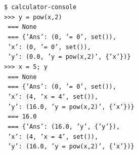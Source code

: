 \documentclass[a4paper, 11pt]{article}
\begin{document}
\noindent\texttt{\$ calculator-console} \\
\texttt{>>> y = pow(x,2)} \\
\texttt{\-\ === None} \\
\texttt{\-\ === \{'Ans': (0, '= 0', set()),} \\
\texttt{\-\ 'x': (0, '= 0', set()),} \\
\texttt{\-\ 'y': (0.0, 'y = pow(x,2)', \{'x'\})\}} \\[0.5cm]
\texttt{>>> x = 5; y} \\
\texttt{\-\ === None} \\
\texttt{\-\ === \{'Ans': (0, '= 0', set()),} \\
\texttt{\-\ 'x': (4, 'x = 4', set()),} \\
\texttt{\-\ 'y': (16.0, 'y = pow(x,2)', \{'x'\})\}} \\[0.5cm]
\texttt{\-\ === 16.0} \\
\texttt{\-\ === \{'Ans': (16.0, 'y', \{'y'\}),} \\
\texttt{\-\ 'x': (4, 'x = 4', set()),} \\
\texttt{\-\ 'y': (16.0, 'y = pow(x,2)', \{'x'\})\}}
\end{document}
